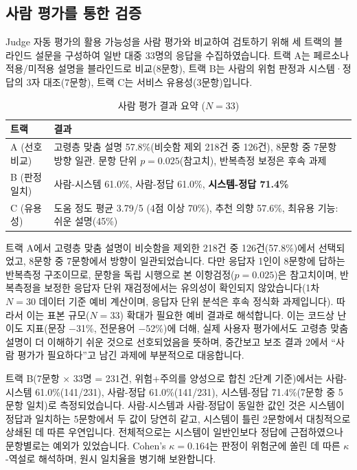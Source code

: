 \documentclass[10pt,a4paper]{article}
\newcommand{\tsz}{\fontsize{9.2}{12}\selectfont}
\begin{document}
\subsection{사람 평가를 통한 검증}
Judge 자동 평가의 활용 가능성을 사람 평가와 비교하여 검토하기 위해 세 트랙의 블라인드 설문을 구성하여 일반 대중 33명의 응답을 수집하였습니다. 트랙 A는 페르소나 적용/미적용 설명을 블라인드로 비교(8문항), 트랙 B는 사람의 위험 판정과 시스템·정답의 3자 대조(7문항), 트랙 C는 서비스 유용성(3문항)입니다.

\begin{table}[!htbp]\centering\tsz
\caption{사람 평가 결과 요약 ($N=33$)}\label{tab:human}
\begin{tabularx}{0.95\textwidth}{L{2.4cm} Y}
\toprule
\textbf{트랙} & \textbf{결과}\\
\midrule
A (선호 비교) & 고령층 맞춤 설명 57.8\%(비슷함 제외 218건 중 126건), 8문항 중 7문항 방향 일관. 문항 단위 $p=0.025$(참고치), 반복측정 보정은 후속 과제\\
B (판정 일치) & 사람-시스템 61.0\%, 사람-정답 61.0\%, \textbf{시스템-정답 71.4\%}\\
C (유용성) & 도움 정도 평균 3.79/5 (4점 이상 70\%), 추천 의향 57.6\%, 최유용 기능: 쉬운 설명(45\%)\\
\bottomrule
\end{tabularx}
\end{table}

트랙 A에서 고령층 맞춤 설명이 비슷함을 제외한 218건 중 126건(57.8\%)에서 선택되었고, 8문항 중 7문항에서 방향이 일관되었습니다. 다만 응답자 1인이 8문항에 답하는 반복측정 구조이므로, 문항을 독립 시행으로 본 이항검정($p=0.025$)은 참고치이며, 반복측정을 보정한 응답자 단위 재검정에서는 유의성이 확인되지 않았습니다(1차 $N=30$ 데이터 기준 예비 계산이며, 응답자 단위 분석은 후속 정식화 과제입니다). 따라서 이는 표본 규모($N=33$) 확대가 필요한 예비 결과로 해석합니다. 이는 코드상 난이도 지표(문장 $-$31\%, 전문용어 $-$52\%)에 더해, 실제 사용자 평가에서도 고령층 맞춤 설명이 더 이해하기 쉬운 것으로 선호되었음을 뜻하며, 중간보고 보조 결과 2에서 ``사람 평가가 필요하다''고 남긴 과제에 부분적으로 대응합니다.

트랙 B(7문항 × 33명 = 231건, 위험+주의를 양성으로 합친 2단계 기준)에서는 사람-시스템 61.0\%(141/231), 사람-정답 61.0\%(141/231), 시스템-정답 71.4\%(7문항 중 5문항 일치)로 측정되었습니다. 사람-시스템과 사람-정답이 동일한 값인 것은 시스템이 정답과 일치하는 5문항에서 두 값이 당연히 같고, 시스템이 틀린 2문항에서 대칭적으로 상쇄된 데 따른 우연입니다. 전체적으로는 시스템이 일반인보다 정답에 근접하였으나 문항별로는 예외가 있었습니다. Cohen's $\kappa=0.164$는 판정이 위험군에 쏠린 데 따른 $\kappa$-역설로 해석하며, 원시 일치율을 병기해 보완합니다.
\end{document}
